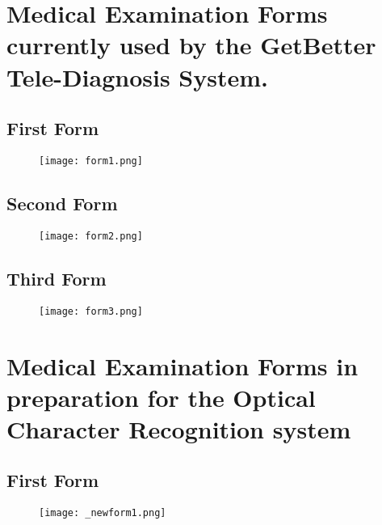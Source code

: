 \pagebreak

\section{Medical Examination Forms currently used by the GetBetter Tele-Diagnosis System.}

\subsection{First Form} 
\begin{figure}[h]                %
	\centering                    %
	\texttt{[image: form1.png]}      %
	\label{}
\end{figure}

\pagebreak
\subsection{Second Form}
\begin{figure}[h]                %
	\centering                    %
	\texttt{[image: form2.png]}      %
	\label{}
\end{figure}

\pagebreak
\subsection{Third Form}
\begin{figure}[h]                %
	\centering                    %
	\texttt{[image: form3.png]}      %
	\label{}
\end{figure}


\pagebreak

\section{Medical Examination Forms in preparation for the Optical Character Recognition system}

\subsection{First Form} 
\begin{figure}[h]                %
	\centering                    %
	\texttt{[image: \_newform1.png]}      %
	\label{}
\end{figure}

